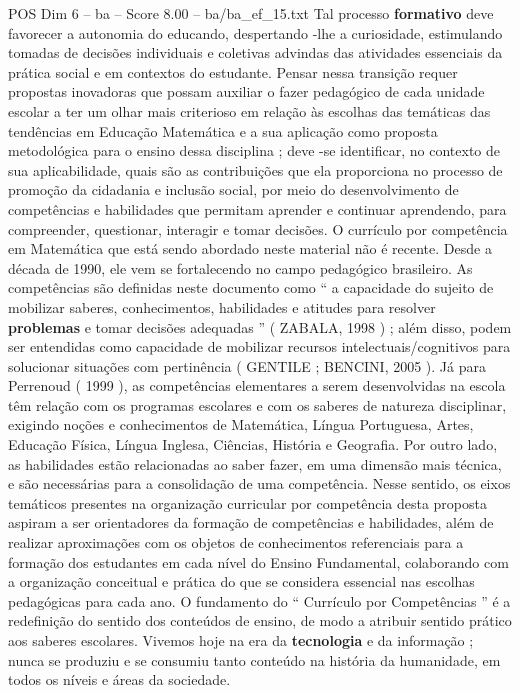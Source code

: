 \begin{textsample}{POS Dim 6 – ba – Score 8.00 – ba/ba\_ef\_15.txt}
Tal processo \textbf{formativo} deve favorecer a autonomia do educando, despertando -lhe a curiosidade, estimulando tomadas de decisões individuais e coletivas advindas das atividades essenciais da prática social e em contextos do estudante.
Pensar nessa transição requer propostas inovadoras que possam auxiliar o fazer pedagógico de cada unidade escolar a ter um olhar mais criterioso em relação às escolhas das temáticas das tendências em Educação Matemática e a sua aplicação como proposta metodológica para o ensino dessa disciplina ; deve -se identificar, no contexto de sua aplicabilidade, quais são as contribuições que ela proporciona no processo de promoção da cidadania e inclusão social, por meio do desenvolvimento de competências e habilidades que permitam aprender e continuar aprendendo, para compreender, questionar, interagir e tomar decisões.
O currículo por competência em Matemática que está sendo abordado neste material não é recente.
Desde a década de 1990, ele vem se fortalecendo no campo pedagógico brasileiro.
As competências são definidas neste documento como “ a capacidade do sujeito de mobilizar saberes, conhecimentos, habilidades e atitudes para resolver \textbf{problemas} e tomar decisões adequadas ” ( ZABALA, 1998 ) ; além disso, podem ser entendidas como capacidade de mobilizar recursos intelectuais/cognitivos para solucionar situações com pertinência ( GENTILE ; BENCINI, 2005 ).
Já para Perrenoud ( 1999 ), as competências elementares a serem desenvolvidas na escola têm relação com os programas escolares e com os saberes de natureza disciplinar, exigindo noções e conhecimentos de Matemática, Língua Portuguesa, Artes, Educação Física, Língua Inglesa, Ciências, História e Geografia.
Por outro lado, as habilidades estão relacionadas ao saber fazer, em uma dimensão mais técnica, e são necessárias para a consolidação de uma competência.
Nesse sentido, os eixos temáticos presentes na organização curricular por competência desta proposta aspiram a ser orientadores da formação de competências e habilidades, além de realizar aproximações com os objetos de conhecimentos referenciais para a formação dos estudantes em cada nível do Ensino Fundamental, colaborando com a organização conceitual e prática do que se considera essencial nas escolhas pedagógicas para cada ano.
O fundamento do “ Currículo por Competências ” é a redefinição do sentido dos conteúdos de ensino, de modo a atribuir sentido prático aos saberes escolares.
Vivemos hoje na era da \textbf{tecnologia} e da informação ; nunca se produziu e se consumiu tanto conteúdo na história da humanidade, em todos os níveis e áreas da sociedade.

\end{textsample}
